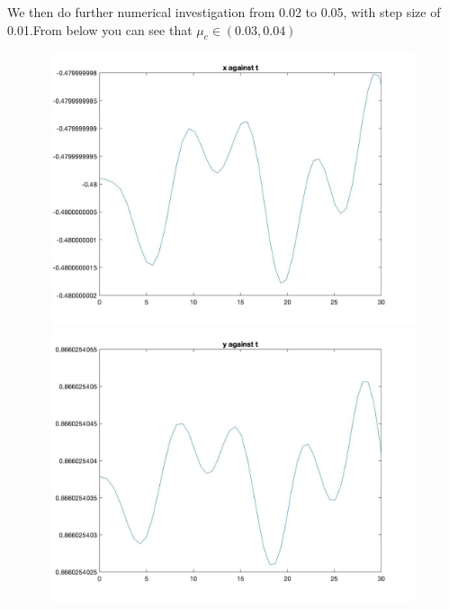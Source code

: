 \documentclass[11pt]{article}
\begin{document}
\newpage
We then do further numerical investigation from 0.02 to 0.05, with step size of 0.01.From below you can see that $\mu_{c} \in (0.03,0.04)$
\begin{figure}[H]
\includegraphics[width = 12cm, height = 8cm]{Q5(16).jpg}
\includegraphics[width = 12cm, height = 8cm]{Q5(17).jpg}
\end{figure}
\end{document}
